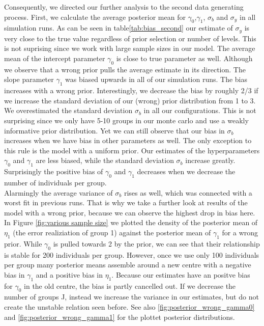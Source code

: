 Consequently, we directed our further analysis to the second data generating process.%
First, we calculate the average posterior mean for $\gamma_0$,$\gamma_1$, $\sigma_b $ and $\sigma_y$ in all simulation runs.
As can be seen in table\ref{tab:bias_second} our estimate of $\sigma_y$ is very close to the true value regardless of prior selection or number of levels. This is not suprising since we work with large sample sizes in our model. 
The average mean of the intercept parameter $\gamma_0$ is close to true parameter as well. Although we observe that a wrong prior pulls the average estimate in its direction.
The slope parameter $\gamma_1$ was biased upwards in all of our simulation runs. The bias increases with a wrong prior. Interestingly, we decrease the bias by roughly 2/3 if we increase the standard deviation of our (wrong) prior distribution from 1 to 3. 
We overestimated the standard deviation $\sigma_b$ in all our configurations. This is not surprising since we only have 5-10 groups in our monte carlo and use a weakly informative prior distribution. Yet we can still observe that our bias in $\sigma_b$ increases when we have bias in other parameters as well. The only exception to this rule is the model with a uniform prior. Our estimates of the hyperparameters $\gamma_0$ and $\gamma_1$ are less biased, while the standard deviation $\sigma_b$ increase greatly.\\
 
Surprisingly the positive bias of $\gamma_0$ and $\gamma_1$ decreases when we decrease the number of individuals per group.\\
Alarmingly the average variance of $\sigma_b$ rises as well, which was connected with a worst fit in previous runs. That is why we take a further look at results of the model with a wrong prior, because we can observe the highest drop in bias here.
In Figure \ref{fig:various sample size} we plotted the density of the posterior mean of $\eta_1$ (the error realiziation of group 1) against the posterior mean of $\gamma_1$ for a wrong prior. While $\gamma_0$ is pulled towards 2 by the prior, we can see that their relationship is stable for 200 individuals per group.
However, once we use only 100 individuals per group many posterior means assemble around a new centre with a negative bias in $\gamma_1$ and a positive bias in $\eta_1$. Because our estimates have an positve bias for $\gamma_0$ in the old centre, the bias is partly cancelled out.
If we decrease the number of groups J, instead we increase the variance in our estimates, but do not create the unstable relation seen before.
See also \ref{fig:posterior_wrong_gamma0} and \ref{fig:posterior_wrong_gamma1} for the plottet posterior distributions. 

